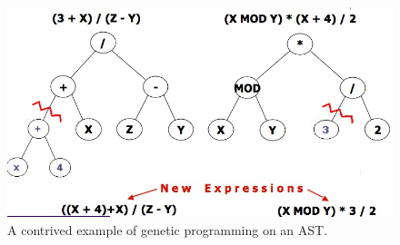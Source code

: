 \begin{figure}[b]
\includegraphics[width=\linewidth]{figs/gptree}
\caption{A contrived example of genetic programming on an AST.}
\label{fig:gp_ex}
\end{figure}